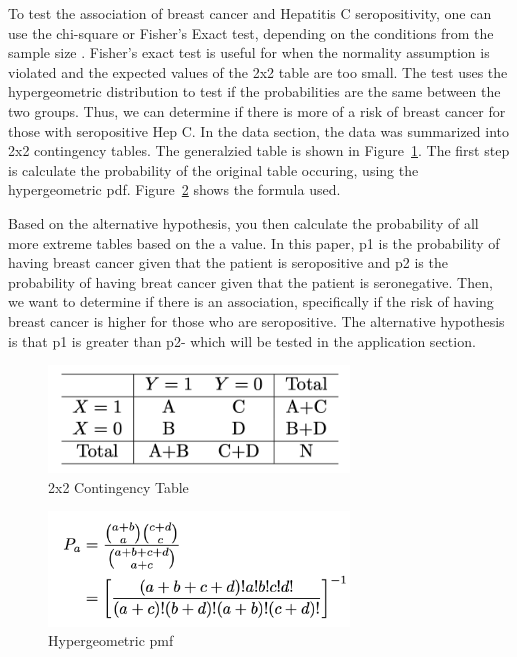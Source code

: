 \documentclass[12pt, titlepage]{article}
\begin{document}
To test the association of breast cancer and Hepatitis C seropositivity, one can use
the chi-square or Fisher's Exact test, depending on the
conditions from the sample size \citep{warner2013testing}. Fisher's
exact test is useful for when the normality assumption is violated 
and the expected values of the 2x2 table are too small. The test uses 
the hypergeometric distribution to test if the probabilities are
the same between the two groups. Thus, we can determine if there is 
more of a risk of breast cancer for those with seropositive Hep C.
In the data section, the data was summarized into 2x2 contingency tables.
The generalzied table is shown in Figure~\ref{fig:table}.
The first step is calculate the probability of the original table occuring,
using the hypergeometric pdf. Figure~\ref{fig:formula} shows the formula used.

Based on the alternative hypothesis, you then calculate the probability of 
all more extreme tables based on the a value. In this paper, p1 is the
probability of having breast cancer given that the patient is seropositive
and p2 is the probability of having breat cancer given that the patient
is seronegative. Then, we want to determine if there is an association,
specifically if the risk of having breast cancer is higher for those who
are seropositive. The alternative hypothesis is that p1 is greater than p2-
which will be tested in the application section.

\begin{figure}[tbp]
  \centering
  \includegraphics[width=8cm]{table.png}
  \caption{2x2 Contingency Table}
  \label{fig:table}
\end{figure}

\begin{figure}[tbp]
  \centering
  \includegraphics[width=8cm]{formula.png}
  \caption{Hypergeometric pmf}
  \label{fig:formula}
\end{figure}
\end{document}
